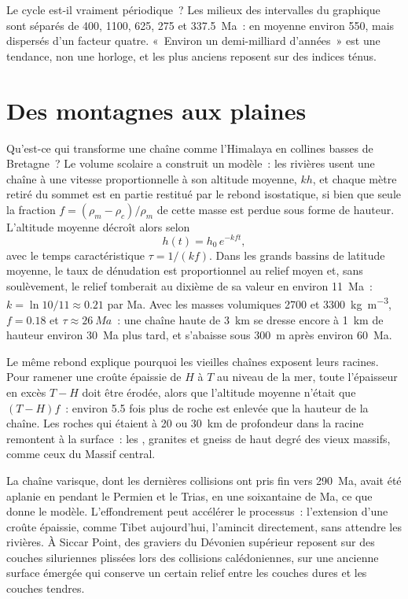 Le cycle est-il vraiment périodique~? Les milieux des intervalles du graphique sont séparés de 400,
1100, 625, 275 et 337.5~Ma~: en moyenne environ 550, mais dispersés d'un facteur
quatre. «~Environ un demi-milliard d'années~» est une tendance, non une horloge, et les
 plus anciens reposent sur des indices ténus.

\section{Des montagnes aux plaines}\label{sec:b2:wilson-cycle:erosion}

Qu'est-ce qui transforme une chaîne comme l'Himalaya en collines basses de Bretagne~? Le volume scolaire
a construit un modèle~: les rivières usent une chaîne à une vitesse proportionnelle à son altitude moyenne, $kh$,
et chaque mètre retiré du sommet est en partie restitué par le rebond isostatique, si bien que seule
la fraction $f = (\rho_m - \rho_c)/\rho_m$ de cette masse est perdue sous forme de hauteur. L'altitude moyenne décroît alors
selon
\[
  h(t) = h_0\,e^{-k f t} ,
\]
avec le temps caractéristique $\tau = 1/(kf)$. Dans les grands bassins de latitude moyenne, le taux de dénudation est
proportionnel au relief moyen et, sans soulèvement, le relief tomberait au dixième de sa
valeur en environ 11~Ma~: $k = \ln 10/11 \approx 0.21$ par Ma. Avec les
masses volumiques 2700 et \qty{3300}{kg.m^{-3}}, $f = 0.18$ et $\tau \approx \qty{26}{Ma}$~: une
chaîne haute de \qty{3}{km} se dresse encore à \qty{1}{km} de hauteur environ 30~Ma plus tard, et
s'abaisse sous \qty{300}{m} après environ 60~Ma.

Le même rebond explique pourquoi les vieilles chaînes exposent leurs racines. Pour ramener une croûte épaissie de
$H$ à $T$ au niveau de la mer, toute l'épaisseur en excès $T - H$ doit être érodée, alors que l'altitude moyenne
n'était que $(T - H)f$~: environ 5.5 fois plus de roche est enlevée que la hauteur de la
chaîne. Les roches qui étaient à 20 ou \qty{30}{km} de profondeur dans la racine remontent à la surface~: les
, granites et gneiss de haut degré des vieux massifs, comme ceux du Massif
central.

La chaîne varisque, dont les dernières collisions ont pris fin vers 290~Ma, avait été
aplanie en  pendant le Permien et le Trias, en une soixantaine de Ma, ce que donne le
modèle. L'effondrement peut accélérer le processus~: l'extension d'une croûte épaissie, comme
Tibet aujourd'hui, l'amincit directement, sans attendre les rivières. À Siccar Point, des graviers du Dévonien supérieur reposent sur
des couches siluriennes plissées lors des collisions calédoniennes, sur une ancienne surface émergée qui conserve
un certain relief entre les couches dures et les couches tendres.

